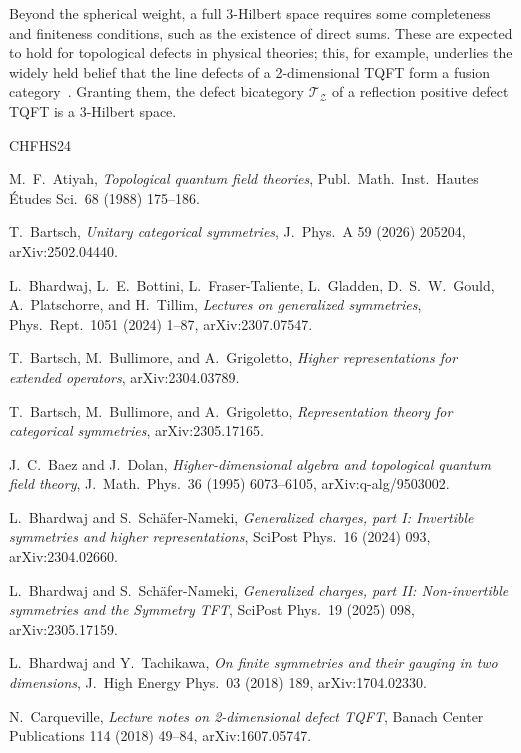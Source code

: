 \documentclass[11pt]{article}
\theoremstyle{definition}
\newcommand{\cT}{\mathcal{T}}
\newcommand{\cZ}{\mathcal{Z}}
\begin{document}
Beyond the spherical weight, a full 3-Hilbert space requires some completeness and finiteness conditions, such as the existence of direct sums. These are expected to hold for topological defects in physical theories; this, for example, underlies the widely held belief that the line defects of a 2-dimensional TQFT form a fusion category~\cite{BT17}. Granting them, the defect bicategory $\cT_\cZ$ of a reflection positive defect TQFT is a 3-Hilbert space.  


\begin{thebibliography}{CHFHS24}

M.~F.~Atiyah,
\emph{Topological quantum field theories},
Publ.\ Math.\ Inst.\ Hautes \'Etudes Sci.\ 68 (1988) 175--186.

T.~Bartsch,
\emph{Unitary categorical symmetries},
J.\ Phys.\ A 59 (2026) 205204,
arXiv:2502.04440.

L.~Bhardwaj, L.~E.~Bottini, L.~Fraser-Taliente, L.~Gladden, D.~S.~W.~Gould, A.~Platschorre, and H.~Tillim,
\emph{Lectures on generalized symmetries},
Phys.\ Rept.\ 1051 (2024) 1--87,
arXiv:2307.07547.

T.~Bartsch, M.~Bullimore, and A.~Grigoletto,
\emph{Higher representations for extended operators},
arXiv:2304.03789.

T.~Bartsch, M.~Bullimore, and A.~Grigoletto,
\emph{Representation theory for categorical symmetries},
arXiv:2305.17165.

J.~C.~Baez and J.~Dolan,
\emph{Higher-dimensional algebra and topological quantum field theory},
J.\ Math.\ Phys.\ 36 (1995) 6073--6105,
arXiv:q-alg/9503002.

L.~Bhardwaj and S.~Sch\"afer-Nameki,
\emph{Generalized charges, part I: Invertible symmetries and higher representations},
SciPost Phys.\ 16 (2024) 093,
arXiv:2304.02660.

L.~Bhardwaj and S.~Sch\"afer-Nameki,
\emph{Generalized charges, part II: Non-invertible symmetries and the Symmetry TFT},
SciPost Phys.\ 19 (2025) 098,
arXiv:2305.17159.

L.~Bhardwaj and Y.~Tachikawa,
\emph{On finite symmetries and their gauging in two dimensions},
J.\ High Energy Phys.\ 03 (2018) 189,
arXiv:1704.02330.

N.~Carqueville,
\emph{Lecture notes on 2-dimensional defect TQFT},
Banach Center Publications 114 (2018) 49--84,
arXiv:1607.05747.


\end{thebibliography}
\end{document}
